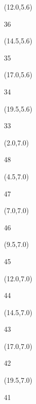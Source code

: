 \documentclass[a4paper]{article}
\newcommand{\myseat}[4]{%
\vspace{-0.1cm} \hspace{-0.5cm}
\parbox[t][2.2cm][t]{3.5cm}{%
\small #1 %
\begin{description}
\vspace{-0.1cm}
\item [ID:] #2
\vspace{-0.1cm}
\item [Team:] #3 \normalsize
\vspace{-0.1cm}
\item \normalsize #4
\vspace{-0.1cm}
\end{description}
}
}
\begin{document}
\begin{textblock}{2.5}(12.0,5.6)
\textblockcolor{}
\myseat{36}{}{}{}
\end{textblock}

\begin{textblock}{2.5}(14.5,5.6)
\textblockcolor{}
\myseat{35}{}{}{}
\end{textblock}

\begin{textblock}{2.5}(17.0,5.6)
\textblockcolor{}
\myseat{34}{}{}{}
\end{textblock}

\begin{textblock}{2.5}(19.5,5.6)
\textblockcolor{}
\myseat{33}{}{}{}
\end{textblock}


\begin{textblock}{2.5}(2.0,7.0)
\textblockcolor{}
\myseat{48}{}{}{}
\end{textblock}

\begin{textblock}{2.5}(4.5,7.0)
\textblockcolor{}
\myseat{47}{}{}{}
\end{textblock}

\begin{textblock}{2.5}(7.0,7.0)
\textblockcolor{}
\myseat{46}{}{}{}
\end{textblock}

\begin{textblock}{2.5}(9.5,7.0)
\textblockcolor{}
\myseat{45}{}{}{}
\end{textblock}

\begin{textblock}{2.5}(12.0,7.0)
\textblockcolor{}
\myseat{44}{}{}{}
\end{textblock}

\begin{textblock}{2.5}(14.5,7.0)
\textblockcolor{}
\myseat{43}{}{}{}
\end{textblock}

\begin{textblock}{2.5}(17.0,7.0)
\textblockcolor{}
\myseat{42}{}{}{}
\end{textblock}

\begin{textblock}{2.5}(19.5,7.0)
\textblockcolor{}
\myseat{41}{}{}{}
\end{textblock}
\end{document}
